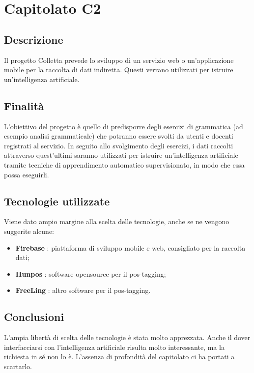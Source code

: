 \section{Capitolato C2}
	\subsection{Descrizione}
		Il progetto Colletta prevede lo sviluppo di un servizio web o un'applicazione mobile per la raccolta di dati indiretta. Questi verrano utilizzati per istruire un'intelligenza artificiale.
	\subsection{Finalità}
		L'obiettivo del progetto è quello di predisporre degli esercizi di grammatica (ad esempio analisi grammaticale) che potranno essere svolti da utenti e docenti registrati al servizio.
		In seguito allo svolgimento degli esercizi, i dati raccolti attraverso quest'ultimi saranno utilizzati per istruire un'intelligenza artificiale tramite tecniche di apprendimento automatico supervisionato, in modo che essa possa eseguirli.
	\subsection{Tecnologie utilizzate}
		Viene dato ampio margine alla scelta delle tecnologie, anche se ne vengono suggerite alcune:
		\begin{itemize}
			\item \textbf{Firebase} : piattaforma di sviluppo mobile e web, consigliato per la raccolta dati;
			\item \textbf{Hunpos} : software opensource per il pos-tagging;
			\item \textbf{FreeLing} : altro software per il pos-tagging.
		\end{itemize} 
	\subsection{Conclusioni}
		L'ampia libertà di scelta delle tecnologie è stata molto apprezzata. Anche il dover interfacciarsi con l'intelligenza artificiale risulta molto interessante, ma la richiesta in sé non lo è. L'assenza di profondità del capitolato ci ha portati a scartarlo.